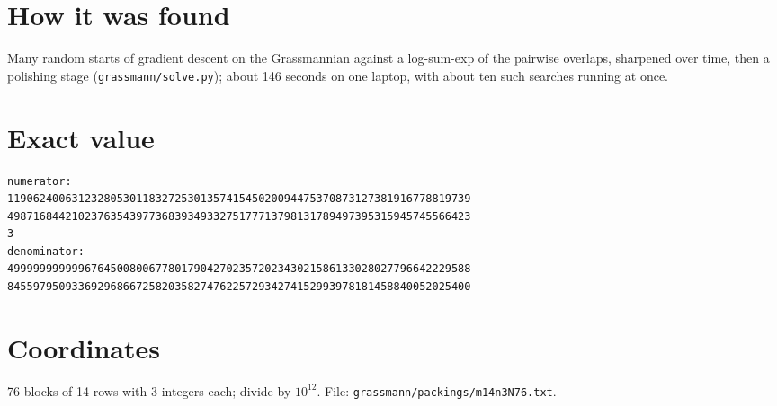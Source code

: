 \documentclass[11pt,a4paper]{article}
\begin{document}
\section{How it was found}
Many random starts of gradient descent on the Grassmannian against a log-sum-exp of the pairwise overlaps, sharpened over time, then a polishing stage (\texttt{grassmann/solve.py}); about 146 seconds on one laptop, with about ten such searches running at once.


\appendix
\section{Exact value}
{\small
\begin{verbatim}
numerator:
119062400631232805301183272530135741545020094475370873127381916778819739
498716844210237635439773683934933275177713798131789497395315945745566423
3
denominator:
499999999999676450080067780179042702357202343021586133028027796642229588
845597950933692968667258203582747622572934274152993978181458840052025400
\end{verbatim}}

\section{Coordinates}
76 blocks of 14 rows with 3 integers each; divide by $10^{12}$. File: \texttt{grassmann/packings/m14n3N76.txt}.
{\tiny
\begin{multicols}{3}
\end{multicols}}
\end{document}
